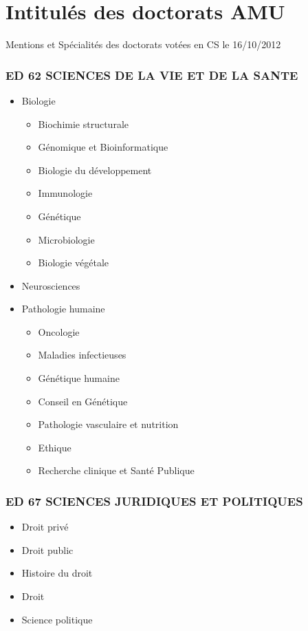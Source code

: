 \section{Intitulés des doctorats AMU}

Mentions et Spécialités des doctorats votées en CS le 16/10/2012

\subsubsection*{ED 62 SCIENCES DE LA VIE ET DE LA SANTE}\label{ed-62-sciences-de-la-vie-et-de-la-sante}

\begin{itemize}
\item Biologie
\begin{itemize}
\item Biochimie structurale
\item Génomique et Bioinformatique
\item Biologie du développement
\item Immunologie
\item Génétique
\item Microbiologie\
\item Biologie végétale
\end{itemize}
\item Neurosciences
\item Pathologie humaine
\begin{itemize}
\item Oncologie
\item Maladies infectieuses
\item Génétique humaine
\item Conseil en Génétique
\item Pathologie vasculaire et nutrition
\item Ethique
\item Recherche clinique et Santé Publique
\end{itemize}
\end{itemize}

\subsubsection*{ED 67 SCIENCES JURIDIQUES ET POLITIQUES}\label{ed-67-sciences-juridiques-et-politiques}

\begin{itemize}
\item Droit privé
\item Droit public
\item Histoire du droit
\item Droit
\item Science politique
\end{itemize}

